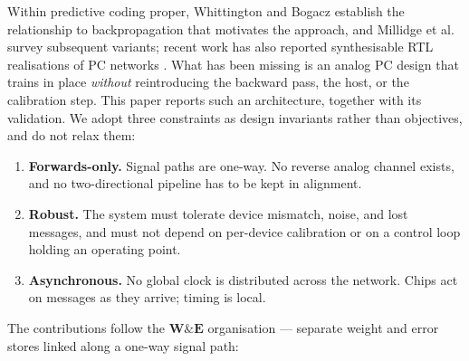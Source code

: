 \documentclass[11pt]{article}
\begin{document}
Within predictive coding proper, Whittington and Bogacz
\cite{whittington2017approximation} establish the relationship to
backpropagation that motivates the approach, and Millidge et al.
\cite{millidge2022predictive} survey subsequent variants; recent work
has also reported synthesisable RTL realisations of PC networks
\cite{oh2026synthesizable}. What has been missing is an analog PC
design that trains in place \emph{without} reintroducing the backward
pass, the host, or the calibration step. This paper reports such an
architecture, together with its validation. We adopt three constraints
as design invariants rather than objectives, and do not relax them:

\begin{enumerate}
\def\labelenumi{\arabic{enumi}.}
\item
  \textbf{Forwards-only.} Signal paths are one-way. No reverse analog
  channel exists, and no two-directional pipeline has to be kept in
  alignment.
\item
  \textbf{Robust.} The system must tolerate device mismatch, noise, and
  lost messages, and must not depend on per-device calibration or on a
  control loop holding an operating point.
\item
  \textbf{Asynchronous.} No global clock is distributed across the
  network. Chips act on messages as they arrive; timing is local.
\end{enumerate}

The contributions follow the \(\bm W\&\bm E\) organisation --- separate
weight and error stores linked along a one-way signal path:
\end{document}
